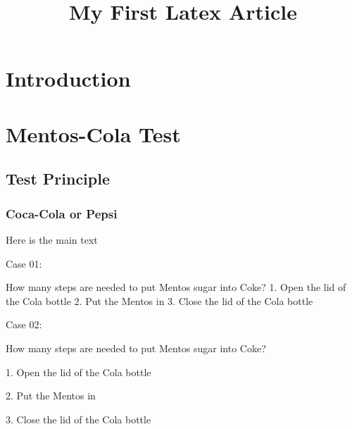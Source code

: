 \documentclass[pdflatex,sn-mathphys]{sn-jnl}%
\theoremstyle{thmstyleone}%
\theoremstyle{thmstyletwo}%
\theoremstyle{thmstylethree}%
\begin{document}
\title[Article Title]{My First Latex Article}

\author*[1]{ }

\author[1]{ }




\maketitle

\section{Introduction}\label{sec1}

\section{Mentos-Cola Test}\label{sec2}

\subsection{Test Principle}\label{subsec1}

\subsubsection{Coca-Cola or Pepsi}\label{subsubsec1}
Here is the main text

Case 01:

How many steps are needed to put Mentos sugar into Coke?
1. Open the lid of the Cola bottle
2. Put the Mentos in
3. Close the lid of the Cola bottle

Case 02:

How many steps are needed to put Mentos sugar into Coke?

1. Open the lid of the Cola bottle

2. Put the Mentos in

3. Close the lid of the Cola bottle
\end{document}
